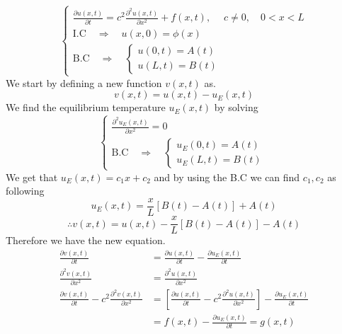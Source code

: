 \documentclass[]{article}
\begin{document}
\begin{equation}
    \begin{cases}
        \displaystyle \frac{\partial u(x,t)}{\partial t} = c^2 \frac{\partial^2 u(x,t)}{\partial x^2} + f(x,t), \quad\; c\neq 0, \quad 0<x<L
        \\
        \text{I.C} \quad \Longrightarrow \quad u(x,0) = \phi(x)
        \\
        \text{B.C} \quad \Longrightarrow \quad
        \begin{cases}
            u(0,t) = A(t)
            \\
            u(L,t) = B(t)        
        \end{cases}  
    \end{cases}
\end{equation}
We start by defining a new function $v(x,t)$ as.
\[
v(x,t) = u(x,t) - u_E(x,t)    
\]
We find the equilibrium temperature $u_E(x,t)$ by solving 
\begin{equation}
    \begin{cases}
        \displaystyle \frac{\partial^2 u_E(x,t)}{\partial x^2}  = 0
        \\
        \text{B.C} \quad \Longrightarrow \quad
            \begin{cases}
                u_E(0,t) = A(t)
                \\
                u_E(L,t) = B(t)        
            \end{cases} 
    \end{cases}
\end{equation}
We get that $u_E(x,t) = c_1 x + c_2$ and by using the B.C we can find $c_1,c_2$ as following
\[
u_E(x,t) = \frac{x}{L}[B(t)-A(t)] +A(t)    
\]
\begin{equation}
\therefore v(x,t) = u(x,t) -  \frac{x}{L}[B(t)-A(t)] -A(t)
\end{equation}
Therefore we have the new equation.
\begin{align*}
\frac{\partial v(x,t)}{\partial t} &= \frac{\partial u(x,t)}{\partial t} - \frac{\partial u_E(x,t)}{\partial t}
\\
\frac{\partial^2 v(x,t)}{\partial x^2} &= \frac{\partial^2 u(x,t)}{\partial x^2}
\\
\frac{\partial v(x,t)}{\partial t} - c^2 \frac{\partial^2 v(x,t)}{\partial x^2} &= \left[ \frac{\partial u(x,t)}{\partial t} - c^2 \frac{\partial^2 u(x,t)}{\partial x^2}\right] - \frac{\partial u_E(x,t)}{\partial t}
\\
&= f(x,t) - \frac{\partial u_E(x,t)}{\partial t} = g(x,t)
\end{align*}
\end{document}
